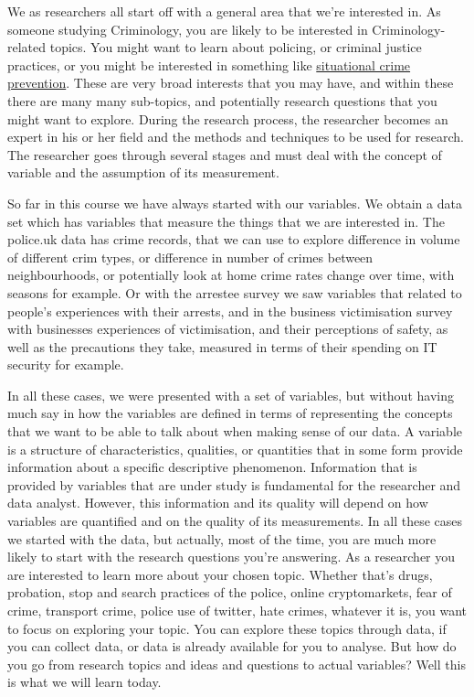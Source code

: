 \documentclass[
]{book}
\begin{document}
We as researchers all start off with a general area that we're interested in. As someone studying Criminology, you are likely to be interested in Criminology-related topics. You might want to learn about policing, or criminal justice practices, or you might be interested in something like \href{http://criminology.oxfordre.com/view/10.1093/acrefore/9780190264079.001.0001/acrefore-9780190264079-e-3}{situational crime prevention}. These are very broad interests that you may have, and within these there are many many sub-topics, and potentially research questions that you might want to explore. During the research process, the researcher becomes an expert in his or her field and the methods and techniques to be used for research. The researcher goes through several stages and must deal with the concept of variable and the assumption of its measurement.

So far in this course we have always started with our variables. We obtain a data set which has variables that measure the things that we are interested in. The police.uk data has crime records, that we can use to explore difference in volume of different crim types, or difference in number of crimes between neighbourhoods, or potentially look at home crime rates change over time, with seasons for example. Or with the arrestee survey we saw variables that related to people's experiences with their arrests, and in the business victimisation survey with businesses experiences of victimisation, and their perceptions of safety, as well as the precautions they take, measured in terms of their spending on IT security for example.

In all these cases, we were presented with a set of variables, but without having much say in how the variables are defined in terms of representing the concepts that we want to be able to talk about when making sense of our data. A variable is a structure of characteristics, qualities, or quantities that in some form provide information about a specific descriptive phenomenon. Information that is provided by variables that are under study is fundamental for the researcher and data analyst. However, this information and its quality will depend on how variables are quantified and on the quality of its measurements. In all these cases we started with the data, but actually, most of the time, you are much more likely to start with the research questions you're answering. As a researcher you are interested to learn more about your chosen topic. Whether that's drugs, probation, stop and search practices of the police, online cryptomarkets, fear of crime, transport crime, police use of twitter, hate crimes, whatever it is, you want to focus on exploring your topic. You can explore these topics through data, if you can collect data, or data is already available for you to analyse. But how do you go from research topics and ideas and questions to actual variables? Well this is what we will learn today.
\end{document}
